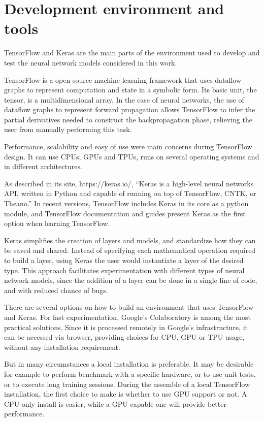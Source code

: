 \chapter{Development environment and tools}
TensorFlow and Keras are the main parts of the environment used to develop and test the neural network models considered in this work.

TensorFlow \cite{abadi_tensorflow:_2016} is a open-source machine learning framework that uses dataflow graphs to represent computation and state in a symbolic form. Its basic unit, the tensor, is a multidimensional array. In the case of neural networks, the use of dataflow graphs to represent forward propagation allows TensorFlow to infer the partial derivatives needed to construct the backpropagation phase, relieving the user from manually performing this task.

Performance, scalability and easy of use were main concerns during TensorFlow design. It can use CPUs, GPUs and TPUs, runs on several operating systems and in different architectures.

As described in its site, https://keras.io/\cite{chollet_keras_2019}, ``Keras is a high-level neural networks API, written in Python and capable of running on top of TensorFlow, CNTK, or Theano.'' In recent versions, TensorFlow includes Keras in its core as a python module, and TensorFlow documentation and guides present Keras as the first option when learning TensorFlow.

Keras simplifies the creation of layers and models, and standardize how they can be saved and shared. Instead of specifying each mathematical operation required to build a layer, using Keras the user would instantiate a layer of the desired type. This approach facilitates experimentation with different types of neural network models, since the addition of a layer can be done in a single line of code, and with reduced chance of bugs.

There are several options on how to build an environment that uses TensorFlow and Keras. For fast experimentation, Google's Colaboratory\cite{carneiro_performance_2018} is among the most practical solutions. Since it is processed remotely in Google's infrastructure, it can be accessed via browser, providing choices for CPU, GPU or TPU usage, without any installation requirement.

But in many circumstances a local installation is preferable. It may be desirable for example to perform benchmark with a specific hardware, or to use unit tests, or to execute long training sessions. 
During the assemble of a local TensorFlow installation, the first choice to make is whether to use GPU support or not. A CPU-only install is easier, while a GPU capable one will provide better performance.

